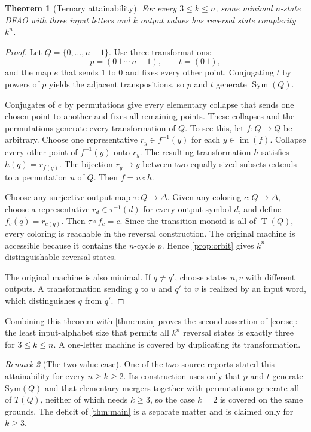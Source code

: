 \documentclass[11pt,a4paper]{article}
\numberwithin{equation}{section}
\newtheorem{theorem}{Theorem}[section]
\theoremstyle{definition}
\theoremstyle{remark}
\newtheorem{remark}[theorem]{Remark}
\newcommand{\D}{\Delta}
\newcommand{\Sym}{\operatorname{Sym}}
\newcommand{\im}{\operatorname{im}}
\newcommand{\TQ}{\operatorname{T}(Q)}
\begin{document}
\begin{theorem}[Ternary attainability]\label{thm:ternary}
For every $3\le k\le n$, some minimal $n$-state DFAO with three input letters
and $k$ output values has reversal state complexity $k^n$.
\end{theorem}
\begin{proof}
Let $Q=\{0,\ldots,n-1\}$. Use three transformations:
\[
 p=(0\,1\,\cdots\,n-1),\qquad t=(0\,1),
\]
and the map $e$ that sends $1$ to $0$ and fixes every other point.
Conjugating $t$ by powers of $p$ yields the adjacent transpositions, so $p$
and $t$ generate $\Sym(Q)$.

Conjugates of $e$ by permutations give every elementary collapse that sends
one chosen point to another and fixes all remaining points. These collapses
and the permutations generate every transformation of $Q$. To see this,
let $f:Q\to Q$ be arbitrary. Choose one representative $r_y\in f^{-1}(y)$
for each $y\in\im(f)$. Collapse every other point of $f^{-1}(y)$ onto $r_y$.
The resulting transformation $h$ satisfies $h(q)=r_{f(q)}$. The bijection
$r_y\mapsto y$ between two equally sized subsets extends to a permutation
$u$ of $Q$. Then $f=u\circ h$.

Choose any surjective output map $\tau:Q\to\D$. Given any coloring
$c:Q\to\D$, choose a representative $r_d\in\tau^{-1}(d)$ for every output
symbol $d$, and define $f_c(q)=r_{c(q)}$. Then $\tau\circ f_c=c$.
Since the transition monoid is all of $\TQ$, every coloring is reachable in
the reversal construction. The original machine is accessible because it
contains the $n$-cycle $p$. Hence \cref{prop:orbit} gives $k^n$ distinguishable
reversal states.

The original machine is also minimal. If $q\ne q'$, choose states $u,v$
with different outputs. A transformation sending $q$ to $u$ and $q'$ to $v$
is realized by an input word, which distinguishes $q$ from $q'$.
\end{proof}

Combining this theorem with \cref{thm:main} proves the second assertion of
\cref{cor:sc}: the least input-alphabet size that permits all $k^n$ reversal
states is exactly three for $3\le k\le n$. A one-letter machine is covered by
duplicating its transformation.

\begin{remark}[The two-value case]\label{rem:ternary-two}
One of the two source reports stated this attainability for every $n\ge k\ge2$.
Its construction uses only that $p$ and $t$ generate $\mathrm{Sym}(Q)$ and that
elementary mergers together with permutations generate all of $T(Q)$, neither
of which needs $k\ge3$, so the case $k=2$ is covered on the same grounds. The
deficit of \cref{thm:main} is a separate matter and is claimed only for
$k\ge3$.
\end{remark}
\end{document}
